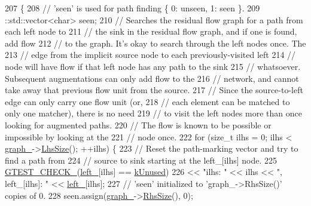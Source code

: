 \begin{DoxyCode}
207                                 \{
208     \textcolor{comment}{// 'seen' is used for path finding \{ 0: unseen, 1: seen \}.}
209     ::std::vector<char> seen;
210     \textcolor{comment}{// Searches the residual flow graph for a path from each left node to}
211     \textcolor{comment}{// the sink in the residual flow graph, and if one is found, add flow}
212     \textcolor{comment}{// to the graph. It's okay to search through the left nodes once. The}
213     \textcolor{comment}{// edge from the implicit source node to each previously-visited left}
214     \textcolor{comment}{// node will have flow if that left node has any path to the sink}
215     \textcolor{comment}{// whatsoever. Subsequent augmentations can only add flow to the}
216     \textcolor{comment}{// network, and cannot take away that previous flow unit from the source.}
217     \textcolor{comment}{// Since the source-to-left edge can only carry one flow unit (or,}
218     \textcolor{comment}{// each element can be matched to only one matcher), there is no need}
219     \textcolor{comment}{// to visit the left nodes more than once looking for augmented paths.}
220     \textcolor{comment}{// The flow is known to be possible or impossible by looking at the}
221     \textcolor{comment}{// node once.}
222     \textcolor{keywordflow}{for} (\textcolor{keywordtype}{size\_t} ilhs = 0; ilhs < \hyperlink{classtesting_1_1internal_1_1MaxBipartiteMatchState_aba20adc38680caf7db98321cfde24dec}{graph\_}->\hyperlink{classtesting_1_1internal_1_1MatchMatrix_a337d9793c61d985dbc1be166e34eed61}{LhsSize}(); ++ilhs) \{
223       \textcolor{comment}{// Reset the path-marking vector and try to find a path from}
224       \textcolor{comment}{// source to sink starting at the left\_[ilhs] node.}
225       \hyperlink{gtest-port_8h_ab54343f0a36dc4cb0ce8a478dd7847b8}{GTEST\_CHECK\_}(\hyperlink{classtesting_1_1internal_1_1MaxBipartiteMatchState_af63f4d7546e914a13b43f30e63f27b6f}{left\_}[ilhs] == \hyperlink{classtesting_1_1internal_1_1MaxBipartiteMatchState_a628d16d346432c1556097b94fad27e42}{kUnused})
226           << \textcolor{stringliteral}{"ilhs: "} << ilhs << \textcolor{stringliteral}{", left\_[ilhs]: "} << \hyperlink{classtesting_1_1internal_1_1MaxBipartiteMatchState_af63f4d7546e914a13b43f30e63f27b6f}{left\_}[ilhs];
227       \textcolor{comment}{// 'seen' initialized to 'graph\_->RhsSize()' copies of 0.}
228       seen.assign(\hyperlink{classtesting_1_1internal_1_1MaxBipartiteMatchState_aba20adc38680caf7db98321cfde24dec}{graph\_}->\hyperlink{classtesting_1_1internal_1_1MatchMatrix_aff068e9fed3a42466c5da8766ac43134}{RhsSize}(), 0);

\end{DoxyCode}
